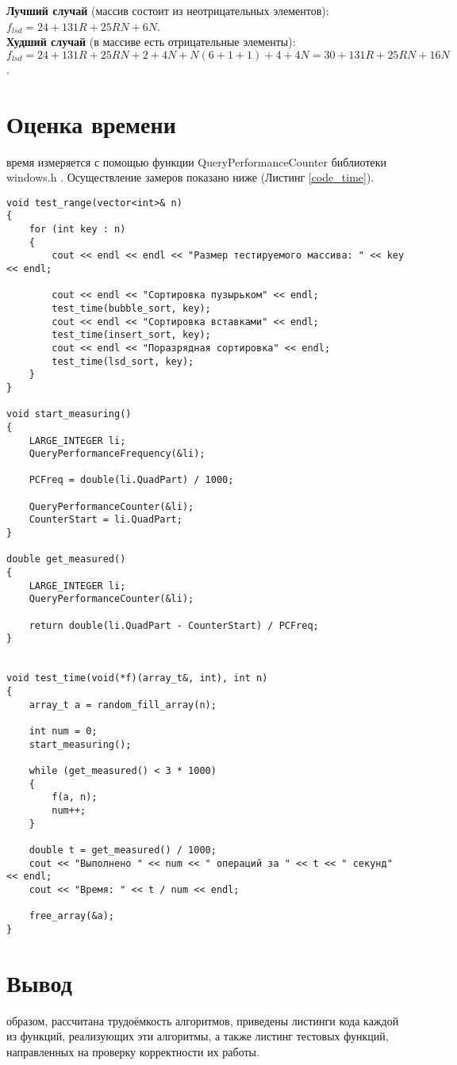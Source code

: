 \textbf{Лучший случай} (массив состоит из неотрицательных элементов):\\
$f_{lsd} = 24 + 131R + 25RN + 6N$.\\

\textbf{Худший случай} (в массиве есть отрицательные элементы):\\
$f_{lsd} = 24 + 131R + 25RN + 2 + 4N + N(6 + 1 + 1) + 4 + 4N = 30 + 131R + 25RN + 16N$.\\

\section{Оценка времени}
 время измеряется с помощью функции QueryPerformanceCounter библиотеки windows.h \cite{Query}. Осуществление замеров показано ниже (Листинг \ref{code_time}).
\begin{lstlisting}[label=code_time, caption = Замеры процессорного времени]
void test_range(vector<int>& n)
{
	for (int key : n)
	{
		cout << endl << endl << "Размер тестируемого массива: " << key << endl;
		
		cout << endl << "Сортировка пузырьком" << endl;
		test_time(bubble_sort, key);
		cout << endl << "Сортировка вставками" << endl;
		test_time(insert_sort, key);
		cout << endl << "Поразрядная сортировка" << endl;
		test_time(lsd_sort, key);
	}
}

void start_measuring()
{
	LARGE_INTEGER li;
	QueryPerformanceFrequency(&li);
	
	PCFreq = double(li.QuadPart) / 1000;
	
	QueryPerformanceCounter(&li);
	CounterStart = li.QuadPart;
}

double get_measured()
{
	LARGE_INTEGER li;
	QueryPerformanceCounter(&li);
	
	return double(li.QuadPart - CounterStart) / PCFreq;
}


void test_time(void(*f)(array_t&, int), int n)
{
	array_t a = random_fill_array(n);
	
	int num = 0;
	start_measuring();
	
	while (get_measured() < 3 * 1000)
	{
		f(a, n);
		num++;
	}
	
	double t = get_measured() / 1000;
	cout << "Выполнено " << num << " операций за " << t << " секунд" << endl;
	cout << "Время: " << t / num << endl;
	
	free_array(&a);
}
\end{lstlisting}

\section*{Вывод}
 образом, рассчитана трудоёмкость алгоритмов, приведены листинги кода каждой из функций, реализующих эти алгоритмы, а также листинг тестовых функций, направленных на проверку корректности их работы.